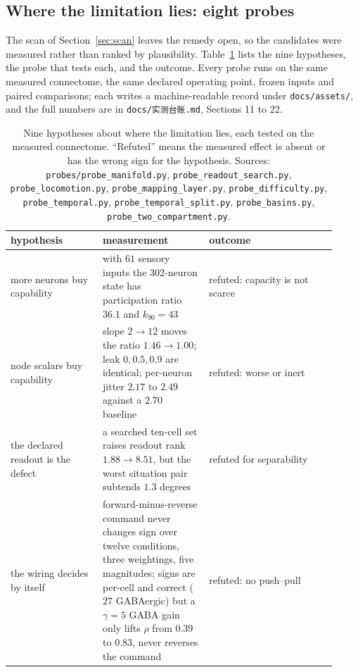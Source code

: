 \documentclass[11pt]{article}
\theoremstyle{remark}
\begin{document}
\subsection{Where the limitation lies: eight probes}
\label{sec:probes}

The scan of Section~\ref{sec:scan} leaves the remedy open, so the candidates were measured rather
than ranked by plausibility. Table~\ref{tab:probes} lists the nine hypotheses, the probe that tests
each, and the outcome. Every probe runs on the same measured connectome, the same declared operating
point, frozen inputs and paired comparisons; each writes a machine-readable record under
\texttt{docs/assets/}, and the full numbers are in \texttt{docs/实测台账.md}, Sections 11 to 22.

\begin{table}[t]
\centering
\small
\caption{Nine hypotheses about where the limitation lies, each tested on the measured connectome.
``Refuted'' means the measured effect is absent or has the wrong sign for the hypothesis.
Sources: \texttt{probes/probe\_manifold.py}, \texttt{probe\_readout\_search.py},
\texttt{probe\_locomotion.py}, \texttt{probe\_mapping\_layer.py}, \texttt{probe\_difficulty.py},
\texttt{probe\_temporal.py}, \texttt{probe\_temporal\_split.py}, \texttt{probe\_basins.py},
\texttt{probe\_two\_compartment.py}.}
\label{tab:probes}
\begin{tabular}{p{0.26\linewidth}p{0.30\linewidth}p{0.36\linewidth}}
\toprule
hypothesis & measurement & outcome \\
\midrule
more neurons buy capability & with $61$ sensory inputs the $302$-neuron state has participation
ratio $36.1$ and $k_{90}=43$ & refuted: capacity is not scarce \\
node scalars buy capability & slope $2\to12$ moves the ratio $1.46\to1.00$; leak $0,0.5,0.9$
are identical; per-neuron jitter $2.17$ to $2.49$ against a $2.70$ baseline & refuted: worse or inert \\
the declared readout is the defect & a searched ten-cell set raises readout rank $1.88\to8.51$,
but the worst situation pair subtends $1.3$ degrees & refuted for separability \\
the wiring decides by itself & forward-minus-reverse command never changes sign over twelve
conditions, three weightings, five magnitudes; signs are per-cell and correct ($27$ GABAergic) but
a $\gamma=5$ GABA gain only lifts $\rho$ from $0.39$ to $0.83$, never reverses the command &
refuted: no push--pull \\

\end{tabular}
\end{table}
\end{document}
